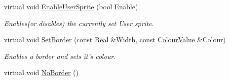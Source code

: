 \begin{DoxyCompactItemize}
virtual void \hyperlink{classphys_1_1UI_1_1Button_a4fe6560484f1d78b08c96eaf967404d2}{EnableUserSprite} (bool Enable)
\begin{DoxyCompactList}\small\item\em Enables(or disables) the currently set User sprite. \item\end{DoxyCompactList}\item 
virtual void \hyperlink{classphys_1_1UI_1_1Button_a8e7fa03ebbdf0c71dc60e5b95635894c}{SetBorder} (const \hyperlink{namespacephys_af7eb897198d265b8e868f45240230d5f}{Real} \&Width, const \hyperlink{classphys_1_1ColourValue}{ColourValue} \&Colour)
\begin{DoxyCompactList}\small\item\em Enables a border and sets it's colour. \item\end{DoxyCompactList}\item 
\hypertarget{classphys_1_1UI_1_1Button_adaf3f9ed9f8478e180278b71cb355db6}{
virtual void \hyperlink{classphys_1_1UI_1_1Button_adaf3f9ed9f8478e180278b71cb355db6}{NoBorder} ()}
\label{d8/d88/classphys_1_1UI_1_1Button_adaf3f9ed9f8478e180278b71cb355db6}


\end{DoxyCompactItemize}
